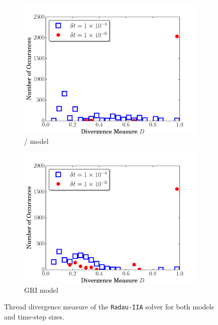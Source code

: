 \documentclass[preprint]{elsarticle}
\begin{document}
\begin{figure}[htb]
  \centering
  \begin{subfigure}{0.49\textwidth}
      \includegraphics[width=\linewidth]{H2_radau2a_div.pdf}
      \caption{\slash{} model}
  \end{subfigure}
  \begin{subfigure}{0.49\textwidth}
      \includegraphics[width=\linewidth]{CH4_radau2a_div.pdf}
      \caption{GRI model}
  \end{subfigure}
  \caption{Thread divergence measure of the \texttt{Radau-IIA} solver for both models and time-step sizes.}
  \label{F:divergence}
\end{figure}
\end{document}

